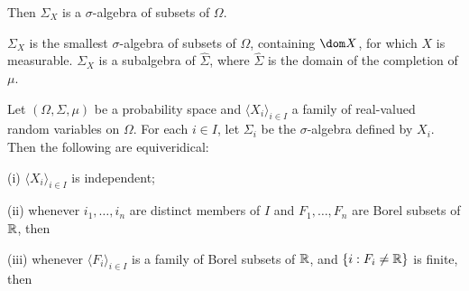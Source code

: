 
\noindent Then $\Sigma_X$ is a $\sigma$-algebra of subsets of $\Omega$.

$\Sigma_X$ is the smallest $\sigma$-algebra of
subsets of $\Omega$, containing $\dom X$, for which $X$ is measurable.
$\Sigma_X$ is a subalgebra of
$\hat\Sigma$, where $\hat\Sigma$ is the domain of the completion of
$\mu$.


 Let $(\Omega,\Sigma,\mu)$ be a probability
space and $\langle X_i\rangle_{i\in I}$ a family of real-valued random
variables on $\Omega$.   For each $i\in I$, let $\Sigma_i$ be the
$\sigma$-algebra defined by $X_i$.   Then the
following are equiveridical:

(i) $\langle X_i\rangle_{i\in I}$ is independent;

(ii) whenever $i_1,\ldots,i_n$ are distinct members of $I$ and
$F_1,\ldots,F_n$ are Borel subsets of $\Bbb R$, then


(iii) whenever $\langle F_i\rangle_{i\in I}$ is a family of Borel
subsets of $\Bbb R$, and $\{i:F_i\ne\Bbb R\}$ is finite, then


